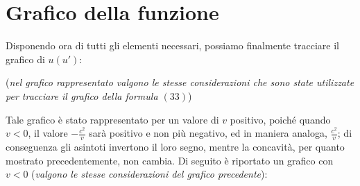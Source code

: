 \documentclass{article}
\begin{document}
\section{Grafico della funzione}
Disponendo ora di tutti gli elementi necessari,
possiamo finalmente tracciare il grafico di \(u(u')\):

\begin{center}
\end{center}

(\textit{nel grafico rappresentato valgono le stesse
considerazioni che sono state utilizzate per
tracciare il grafico della formula \((33)\)})\hfill\break

Tale grafico è stato rappresentato per un valore di
\(v\) positivo, poiché quando \(v < 0\), il valore
\(- \frac{c^2}{v}\) sarà positivo e non più negativo,
ed in maniera analoga, \(\frac{c^2}{v}\); di conseguenza
gli asintoti invertono il loro segno, mentre la concavità,
per quanto mostrato precedentemente, non cambia.
Di seguito è riportato un grafico con \(v < 0\)
(\textit{valgono le stesse considerazioni del
grafico precedente}):

\end{document}
